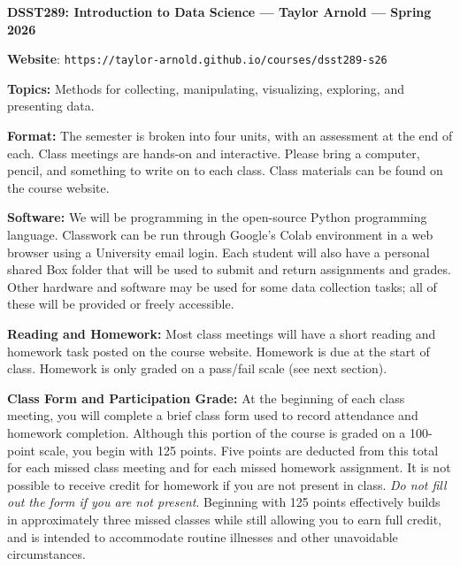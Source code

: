 \documentclass[11pt, a4paper]{article}
\begin{document}
\begin{center}
\textbf{DSST289: Introduction to Data Science --- Taylor Arnold --- Spring 2026}
\end{center}

\vspace{0.5cm}

\textbf{Website}: \texttt{https://taylor-arnold.github.io/courses/dsst289-s26}

\bigskip

\textbf{Topics:}
Methods for collecting, manipulating, visualizing, exploring, and presenting
data.

\bigskip

\textbf{Format:}
The semester is broken into four units, with an assessment at the end of each.
Class meetings are hands-on and interactive. Please bring a computer, pencil,
and something to write on to each class. Class materials can be found on the
course website.

\bigskip

\textbf{Software:}
We will be programming in the open-source Python programming language. 
Classwork can be run through Google's Colab environment in a web browser using
a University email login. Each student will also have a personal shared Box folder
that will be used to submit and return assignments and grades. Other hardware
and software may be used for some data collection tasks; all of these will
be provided or freely accessible. 

\bigskip

\textbf{Reading and Homework:}
Most class meetings will have a short reading and homework task posted on the course website. Homework is due at the start of class. Homework is only graded on a pass/fail scale (see next section).

\bigskip

\textbf{Class Form and Participation Grade:}
At the beginning of each class meeting, you will complete a brief class form used to record attendance and homework completion. Although this portion of the course is graded on a 100-point scale, you begin with 125 points. Five points are deducted from this total for each missed class meeting and for each missed homework assignment. It is not possible to receive credit for homework if you are not present in class. \textit{Do not fill out the form if you are not present}. Beginning with 125 points effectively builds in approximately three missed classes while still allowing you to earn full credit, and is intended to accommodate routine illnesses and other unavoidable circumstances.
\end{document}
